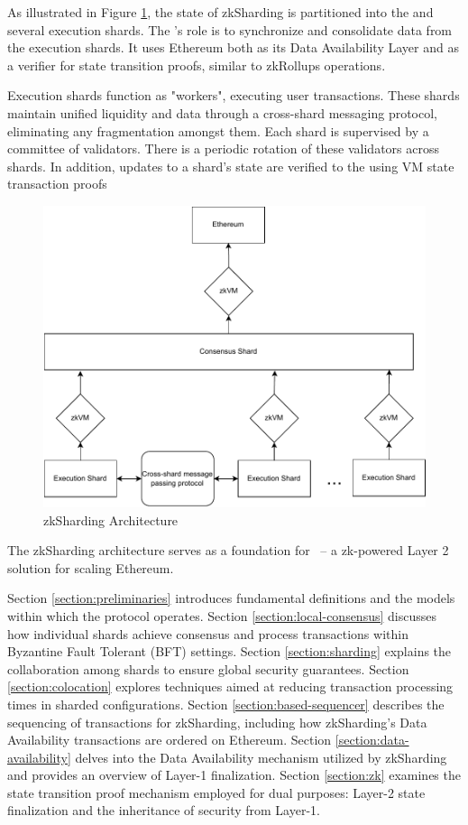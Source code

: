 As illustrated in Figure \ref{figure:overview}, 
 the state of zkSharding is partitioned into the \mainshard and several execution shards. 
The \mainshard’s role is to synchronize and consolidate data 
 from the execution shards.
It uses Ethereum both as its Data Availability Layer and as a verifier for state transition proofs,
 similar to zkRollups operations.

Execution shards function as "workers", executing user transactions. 
These shards maintain unified liquidity and data through a cross-shard messaging protocol, 
 eliminating any fragmentation amongst them.
Each shard is supervised by a committee of validators. 
There is a periodic rotation of these validators across shards. 
In addition, updates to a shard’s state are verified 
 to the \mainshard using VM state transaction proofs

\begin{figure}
    \centering
	\includegraphics[scale=0.8]{figures/overview.drawio.pdf}
    \caption{zkSharding Architecture}
     \label{figure:overview}
\end{figure}

The zkSharding architecture serves as a foundation for \nil\ -- a zk-powered Layer 2 solution for scaling Ethereum. 

Section \ref{section:preliminaries} introduces fundamental definitions 
 and the models within which the protocol operates.
Section \ref{section:local-consensus} discusses how individual shards achieve consensus 
 and process transactions within Byzantine Fault Tolerant (BFT) settings.
Section \ref{section:sharding} explains the collaboration among shards 
 to ensure global security guarantees.
Section \ref{section:colocation} explores techniques aimed at 
 reducing transaction processing times in sharded configurations.
Section \ref{section:based-sequencer} describes the sequencing of transactions for zkSharding, 
 including how zkSharding's Data Availability transactions are ordered on Ethereum.
Section \ref{section:data-availability} delves into the Data Availability 
 mechanism utilized by zkSharding and provides an overview of Layer-1 finalization.
Section \ref{section:zk} examines the state transition proof mechanism 
 employed for dual purposes: Layer-2 state finalization and the inheritance of security from Layer-1.